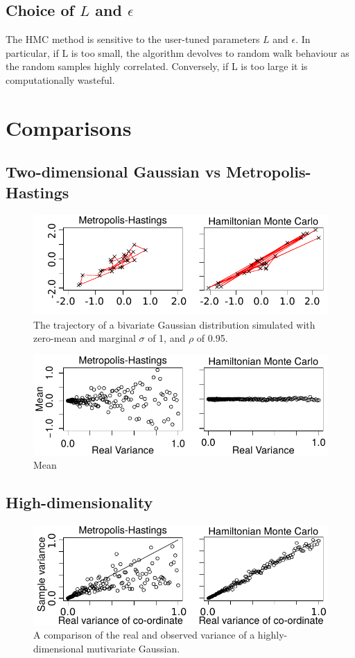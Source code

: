 \documentclass[11pt]{article}
\begin{document}
\subsection{Choice of $L$ and $\epsilon$}
The HMC method is sensitive to the user-tuned parameters $L$ and $\epsilon$. In particular, if L is too small, the algorithm devolves to random walk behaviour as the random samples highly correlated. Conversely, if L is too large it is computationally wasteful.
\section{Comparisons}
\subsection{Two-dimensional Gaussian vs Metropolis-Hastings}
\begin{figure}[H]
\center
  \includegraphics[width=5in]{images/MHvsHM_explore.pdf}
\caption{The trajectory of a bivariate Gaussian distribution simulated with zero-mean and marginal $\sigma$ of 1, and $\rho$ of 0.95.}
\end{figure}


\begin{figure}[H]
\center
  \includegraphics[width=5in]{images/MHvsHM_var.pdf}
  \caption{Mean}
\end{figure}
\subsection{High-dimensionality}
\begin{figure}[H]
\center
  \includegraphics[width=5in]{images/MHvsHM_varcoord.pdf}
  \caption{A comparison of the real and observed variance of a highly-dimensional mutivariate Gaussian.}
\end{figure}
\end{document}
